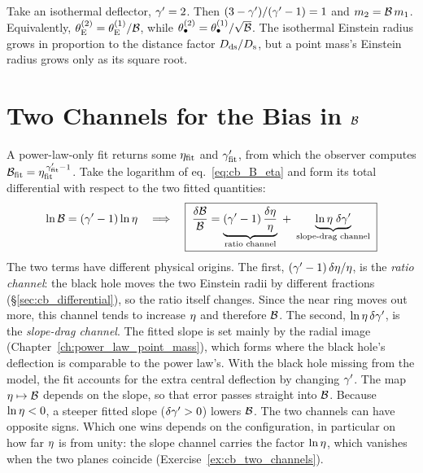 \begin{annotation}
Take an isothermal deflector, $\gamma'=2$. Then $(3-\gamma')/(\gamma'-1)=1$ and
$m_2=\mathcal{B}\,m_1$. Equivalently,
$\theta_{\mathrm{E}}^{(2)}=\theta_{\mathrm{E}}^{(1)}/\mathcal{B}$, while
$\theta_{\bullet}^{(2)}=\theta_{\bullet}^{(1)}/\sqrt{\mathcal{B}}$. The isothermal Einstein
radius grows in proportion to the distance factor $D_{\mathrm{ds}}/D_{\mathrm{s}}$, but a
point mass's Einstein radius grows only as its square root.
\end{annotation}


\section{Two Channels for the Bias in \texorpdfstring{$\mathcal{B}$}{B}}
\label{sec:cb_channels}

A power-law-only fit returns some $\eta_{\rm fit}$ and
$\gamma'_{\rm fit}$, from which the observer computes
$\mathcal{B}_{\rm fit}=\eta_{\rm fit}^{\,\gamma'_{\rm fit}-1}$. Take the
logarithm of eq.~\eqref{eq:cb_B_eta} and form its total differential
with respect to the two fitted quantities:
\begin{equation}
  \ln\mathcal{B} = (\gamma'-1)\ln\eta
  \quad\Longrightarrow\quad
  \boxed{\;
  \frac{\delta\mathcal{B}}{\mathcal{B}}
  = \underbrace{(\gamma'-1)\,\frac{\delta\eta}{\eta}}_{\text{ratio channel}}
  \;+\;
  \underbrace{\ln\eta\;\delta\gamma'}_{\text{slope-drag channel}}
  \;}
  \label{eq:cb_two_channels}
\end{equation}
 The two terms have different physical
origins. The first, $(\gamma'-1)\,\delta\eta/\eta$, is the
\emph{ratio channel}: the black hole moves the two Einstein radii by
different fractions (\S\ref{sec:cb_differential}), so the ratio itself
changes. Since the near ring moves out more, this channel tends to
increase $\eta$ and therefore $\mathcal{B}$. The second,
$\ln\eta\,\delta\gamma'$, is the \emph{slope-drag channel}. The fitted
slope is set mainly by the radial image
(Chapter~\ref{ch:power_law_point_mass}), which forms where the black
hole's deflection is comparable to the power law's. With the black hole
missing from the model, the fit accounts for the extra central
deflection by changing $\gamma'$. The map $\eta\mapsto\mathcal{B}$ depends on
the slope, so that error passes straight into $\mathcal{B}$. Because
$\ln\eta<0$, a steeper fitted slope ($\delta\gamma'>0$) lowers $\mathcal{B}$.
The two channels can have opposite signs. Which one wins depends on the
configuration, in particular on how far $\eta$ is from unity: the
slope channel carries the factor $\ln\eta$, which vanishes when the
two planes coincide (Exercise~\ref{ex:cb_two_channels}).

